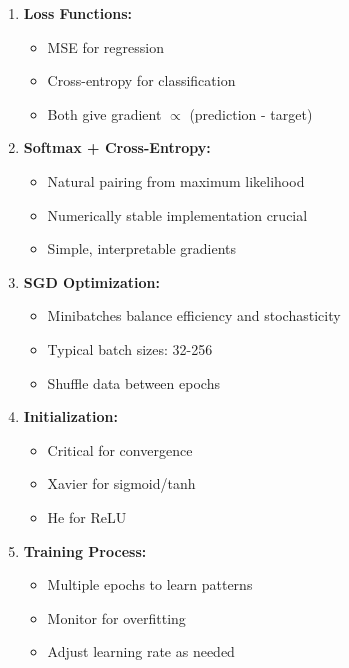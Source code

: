 \documentclass{article}
\begin{document}
\begin{tcolorbox}[colback=blue!5!white, colframe=blue!50!black, title=Key Takeaways]
\begin{enumerate}
\item \textbf{Loss Functions:}
    \begin{itemize}
    \item MSE for regression
    \item Cross-entropy for classification
    \item Both give gradient $\propto$ (prediction - target)
    \end{itemize}
    
\item \textbf{Softmax + Cross-Entropy:}
    \begin{itemize}
    \item Natural pairing from maximum likelihood
    \item Numerically stable implementation crucial
    \item Simple, interpretable gradients
    \end{itemize}
    
\item \textbf{SGD Optimization:}
    \begin{itemize}
    \item Minibatches balance efficiency and stochasticity
    \item Typical batch sizes: 32-256
    \item Shuffle data between epochs
    \end{itemize}
    
\item \textbf{Initialization:}
    \begin{itemize}
    \item Critical for convergence
    \item Xavier for sigmoid/tanh
    \item He for ReLU
    \end{itemize}
    
\item \textbf{Training Process:}
    \begin{itemize}
    \item Multiple epochs to learn patterns
    \item Monitor for overfitting
    \item Adjust learning rate as needed
    \end{itemize}
\end{enumerate}
\end{tcolorbox}
\end{document}
